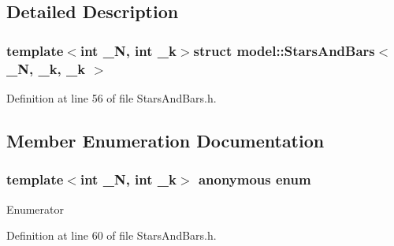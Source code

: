 \subsection{Detailed Description}
\subsubsection*{template$<$int \+\_\+\+N, int \+\_\+k$>$struct model\+::\+Stars\+And\+Bars$<$ \+\_\+\+N, \+\_\+k, \+\_\+k $>$}



Definition at line 56 of file Stars\+And\+Bars.\+h.



\subsection{Member Enumeration Documentation}
\hypertarget{structmodel_1_1_stars_and_bars_3_01___n_00_01__k_00_01__k_01_4_abcf381dda1d568db27f36f172386d8bf}{}\subsubsection[{anonymous enum}]{\setlength{\rightskip}{0pt plus 5cm}template$<$int \+\_\+\+N, int \+\_\+k$>$ anonymous enum}\label{structmodel_1_1_stars_and_bars_3_01___n_00_01__k_00_01__k_01_4_abcf381dda1d568db27f36f172386d8bf}
\begin{Desc}
\item[Enumerator]\par
\begin{description}
\item[{\em 
\hypertarget{structmodel_1_1_stars_and_bars_3_01___n_00_01__k_00_01__k_01_4_abcf381dda1d568db27f36f172386d8bfada0826f890db89ecacb167dcd99d3eed}{}k\label{structmodel_1_1_stars_and_bars_3_01___n_00_01__k_00_01__k_01_4_abcf381dda1d568db27f36f172386d8bfada0826f890db89ecacb167dcd99d3eed}
}]\end{description}
\end{Desc}


Definition at line 60 of file Stars\+And\+Bars.\+h.

